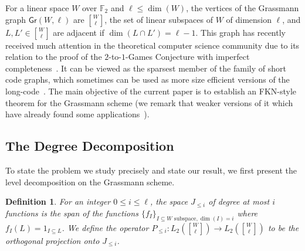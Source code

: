 \documentclass[11pt]{article}
\newtheorem{definition}[thm]{Definition}
\renewcommand\leq{\leqslant}
\providecommand{\sqbinom}[2]{\genfrac{[}{]}{0pt}{}{#1}{#2}}
\begin{document}
For a linear space $W$ over $\mathbb{F}_2$ and $\ell\leq \dim(W)$, the vertices of the Grassmann graph $\mathsf{Gr}(W,\ell)$ are $\sqbinom{W}{\ell}$, the set of linear subspaces of $W$ of dimension $\ell$, and $L,L'\in {\sqbinom{W}{\ell}}$ are adjacent if $\dim(L\cap L')=\ell-1$. This graph has recently received much attention in the theoretical computer science community due to its relation to the proof of the $2$-to-$1$-Games Conjecture with imperfect completeness~\cite{KMS1,DKKMS1,DKKMS2,KMS2}. It can be viewed as the sparsest member of the family of short code graphs, which sometimes can be used as more size efficient versions of the long-code~\cite{barak2015making,khot2017hardness}.
The main objective of the current paper is to establish an FKN-style theorem for the Grassmann scheme (we remark that weaker versions of it which have already found some applications~\cite{KaufmanM,MZheng}).

\subsection{The Degree Decomposition} 
To state the problem we study precisely and state our result, we first present the level decomposition on the Grassmann scheme. 
\begin{definition}
    For an integer $0\leq i\leq \ell$, the space $J_{\leq i}$ of degree at most $i$ functions is the span of the functions $\{f_I\}_{I\subseteq W\text{ subspace}, \dim(I)=i}$ where $f_I(L) = 1_{I\subseteq L}$. We define the operator $P_{\leq i}\colon L_2({\sqbinom{W}{\ell}})\to L_2({\sqbinom{W}{\ell}})$ to be the orthogonal projection onto $J_{\leq i}$.
\end{definition}
\end{document}

